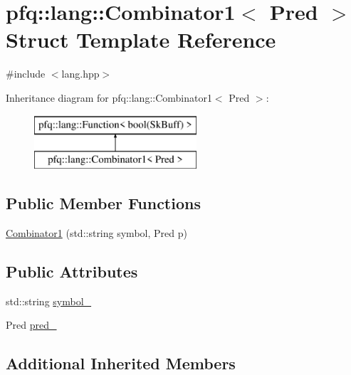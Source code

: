 \hypertarget{structpfq_1_1lang_1_1Combinator1}{\section{pfq\+:\+:lang\+:\+:Combinator1$<$ Pred $>$ Struct Template Reference}
\label{structpfq_1_1lang_1_1Combinator1}
}


{\ttfamily \#include $<$lang.\+hpp$>$}

Inheritance diagram for pfq\+:\+:lang\+:\+:Combinator1$<$ Pred $>$\+:\begin{figure}[H]
\begin{center}
\leavevmode
\includegraphics[height=2.000000cm]{structpfq_1_1lang_1_1Combinator1}
\end{center}
\end{figure}
\subsection*{Public Member Functions}
\begin{DoxyCompactItemize}
\item 
\hyperlink{structpfq_1_1lang_1_1Combinator1_aeb68a96d32618eb97abc4d973356e095}{Combinator1} (std\+::string symbol, Pred p)
\end{DoxyCompactItemize}
\subsection*{Public Attributes}
\begin{DoxyCompactItemize}
\item 
std\+::string \hyperlink{structpfq_1_1lang_1_1Combinator1_a3b3ca6db659c6cde320dd9a8065cc341}{symbol\+\_\+}
\item 
Pred \hyperlink{structpfq_1_1lang_1_1Combinator1_a334e67a591c1e73972d41b78a04909bd}{pred\+\_\+}
\end{DoxyCompactItemize}
\subsection*{Additional Inherited Members}


